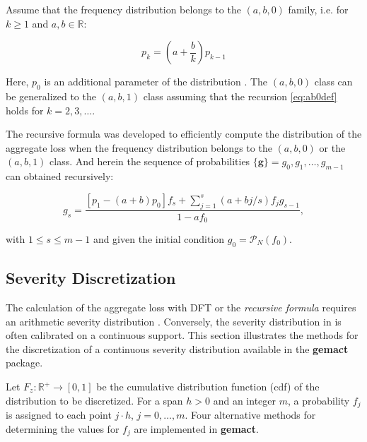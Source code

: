 \documentclass{article}
\begin{document}
Assume that the frequency distribution belongs to the $(a,b,0)$ family, i.e. for $k \geq 1$ and $a,b\in\mathbb{R}$:

\begin{equation}
    \label{eq:ab0def}
    p_k=\left(a+\frac{b}{k}\right)p_{k-1}
\end{equation}

Here, $p_0$ is an additional parameter of the distribution \cite[p.~505]{klugman98}. The $(a,b,0)$ class can be generalized to the $(a,b,1)$ class assuming that the recursion \eqref{eq:ab0def} holds for $k=2,3,\ldots$.
\newline

The recursive formula was developed to efficiently compute the distribution of the aggregate loss when the frequency distribution belongs to the $(a,b,0)$ or the $(a,b,1)$ class. And herein the sequence of probabilities $\mathbf{\{{g}\}}=g_0, g_1, \ldots , g_{m-1}$ can obtained recursively:

\begin{equation}
\label{eq:rec}
    g_s=\frac{\left[p_1-(a+b) p_0\right] f_s+\sum_{j=1}^s(a+b j / s) f_j g_{s-1}}{1-a f_0},
\end{equation}

with $1 \leq s \leq m-1$ and given the initial condition $g_0=\mathcal{P}_{N}\left(f_0\right)$.


\subsection{Severity Discretization}

The calculation of the aggregate loss with DFT or the \textit{recursive formula} requires an arithmetic severity distribution \cite{embrechts09}. Conversely, the severity distribution in  is often calibrated on a continuous support. This section illustrates the methods for the discretization of a continuous severity distribution available in the \textbf{gemact} package. 

Let $F_z: \mathbb{R^+} \rightarrow [0, 1]$ be the cumulative distribution function (cdf) of the distribution to be discretized. 
For a span $h>0$ and an integer $m$, a probability $f_j$ is assigned to each point $j \cdot h$, $j= 0, \ldots ,m$. Four alternative methods for determining the values for $f_j$ are implemented in \textbf{gemact}.
\end{document}
